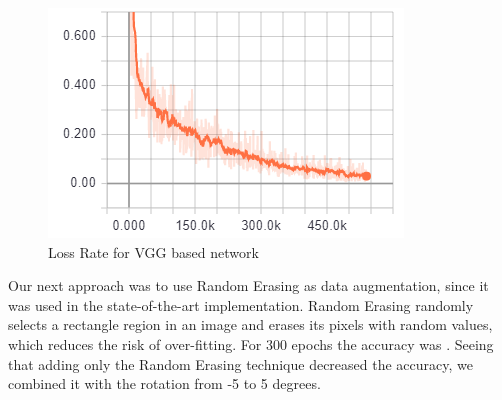 \documentclass{article}
\begin{document}
    
    \begin{figure}[h]
    \begin{center}
		\includegraphics[scale=0.6]{lossRateVGG.png}
        \caption{Loss Rate for VGG based network\label{fig:lossRateVGG}}    
    \end{center}
    \end{figure}
    
    Our next approach was to use Random Erasing as data augmentation, since it was used in the state-of-the-art implementation. Random Erasing randomly
selects a rectangle region in an image and erases its pixels with random values, which reduces the risk of over-fitting. For 300 epochs the accuracy was . Seeing that adding only the Random Erasing technique decreased the accuracy, we combined it with the rotation from -5 to 5 degrees.
    
    





\end{document}
